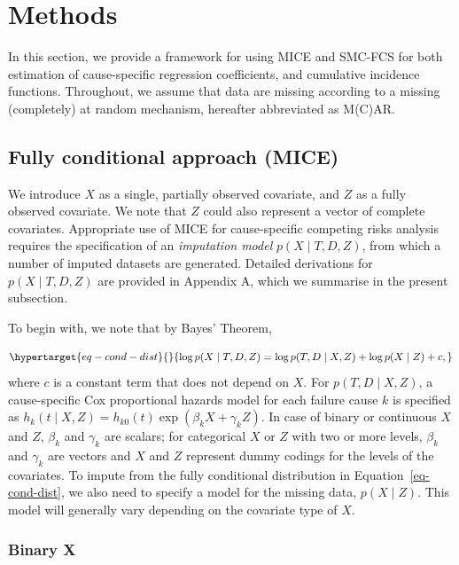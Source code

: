 \documentclass[
  letterpaper,
  DIV=11,
  numbers=noendperiod]{scrreprt}
\begin{document}
\hypertarget{sec-imp-models}{%
\section{Methods}\label{sec-imp-models}}

In this section, we provide a framework for using MICE and SMC-FCS for
both estimation of cause-specific regression coefficients, and
cumulative incidence functions. Throughout, we assume that data are
missing according to a missing (completely) at random mechanism,
hereafter abbreviated as M(C)AR.

\hypertarget{sec-imp-models-main}{%
\subsection{Fully conditional approach
(MICE)}\label{sec-imp-models-main}}

We introduce \(X\) as a single, partially observed covariate, and \(Z\)
as a fully observed covariate. We note that \(Z\) could also represent a
vector of complete covariates. Appropriate use of MICE for
cause-specific competing risks analysis requires the specification of an
\emph{imputation model} \(p(X \mid T,D,Z)\), from which a number of
imputed datasets are generated. Detailed derivations for
\(p(X \mid T,D,Z)\) are provided in Appendix A, which we summarise in
the present subsection.

To begin with, we note that by Bayes' Theorem,

\begin{equation}\protect\hypertarget{eq-cond-dist}{}{
    \log p(X \mid T,D,Z) = \log p(T,D \mid X, Z) + \log p(X \mid Z) + c,
}\label{eq-cond-dist}\end{equation} where \(c\) is a constant term that
does not depend on \(X\). For \(p(T,D \mid X, Z)\), a cause-specific Cox
proportional hazards model for each failure cause \(k\) is specified as
\(h_k(t \mid X, Z) = h_{k0}(t)\exp(\beta_k X + \gamma_k Z)\). In case of
binary or continuous \(X\) and \(Z\), \(\beta_k\) and \(\gamma_k\) are
scalars; for categorical \(X\) or \(Z\) with two or more levels,
\(\beta_k\) and \(\gamma_k\) are vectors and \(X\) and \(Z\) represent
dummy codings for the levels of the covariates. To impute from the fully
conditional distribution in Equation~\ref{eq-cond-dist}, we also need to
specify a model for the missing data, \(p(X \mid Z)\). This model will
generally vary depending on the covariate type of \(X\).

\hypertarget{binary-x}{%
\subsubsection{Binary X}\label{binary-x}}
\end{document}
